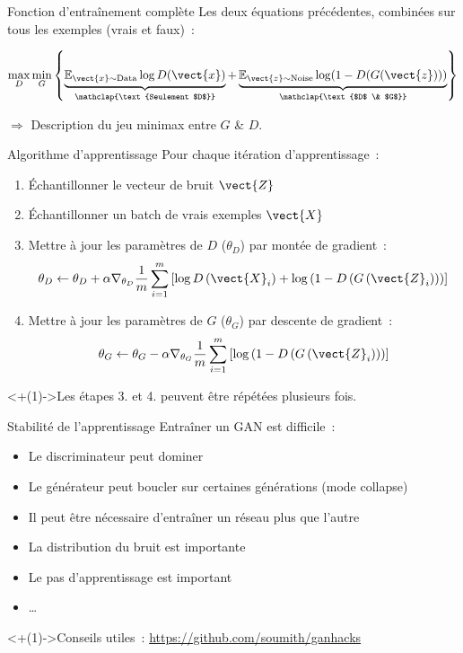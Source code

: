 \begin{frame}{Fonction d'entraînement complète}
  Les deux équations précédentes, combinées sur tous les exemples (vrais et faux)~:

  \[
    \max_D \min_G \left\{
      \underbrace{\mathbb{E}_{\vect{x} \sim \text{Data}} \log D(\vect{x})}_{\mathclap{\text{Seulement $D$}}}
      + \underbrace{\mathbb{E}_{\vect{z} \sim \text{Noise}} \log (1 - D(G(\vect{z})))}_{\mathclap{\text{$D$ \& $G$}}}
    \right\}
  \]

  $\Rightarrow$ Description du jeu minimax entre $G$ \& $D$.
\end{frame}

\begin{frame}{Algorithme d'apprentissage}
  Pour chaque itération d'apprentissage~:

  \begin{enumerate}[<+(1)->]
    \item Échantillonner le vecteur de bruit $\vect{Z}$
    \item Échantillonner un batch de vrais exemples $\vect{X}$
    \item Mettre à jour les paramètres de $D$ ($\theta_D$) par montée de gradient~:
    \[
      \theta_D \leftarrow \theta_D + \alpha \nabla_{\theta_D} \frac{1}{m} \sum_{i=1}^m \left[
        \log D\left(\vect{X}_i\right) + \log\left(1 - D\left(G\left(\vect{Z}_i\right)\right)\right)
      \right]
    \]
    \item Mettre à jour les paramètres de $G$ ($\theta_G$) par descente de gradient~:
    \[
      \theta_G \leftarrow \theta_G - \alpha \nabla_{\theta_G} \frac{1}{m} \sum_{i=1}^m \left[
        \log\left(1 - D\left(G\left(\vect{Z}_i\right)\right)\right)
      \right]
    \]
  \end{enumerate}
  \onslide<+(1)->{Les étapes 3. et 4. peuvent être répétées plusieurs fois.}
\end{frame}

\begin{frame}{Stabilité de l'apprentissage}
  Entraîner un GAN est difficile~:

  \begin{itemize}[<+(1)->]
    \item Le discriminateur peut dominer
    \item Le générateur peut boucler sur certaines générations (mode collapse)
    \item Il peut être nécessaire d'entraîner un réseau plus que l'autre
    \item La distribution du bruit est importante
    \item Le pas d'apprentissage est important
    \item …
  \end{itemize}

  \onslide<+(1)->{Conseils utiles~: \url{https://github.com/soumith/ganhacks}}
\end{frame}
